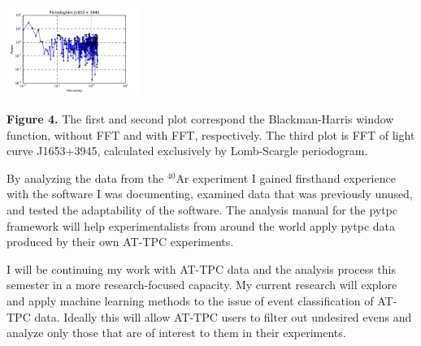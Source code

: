 \documentclass[a0paper,portrait]{baposter}
\begin{document}
\begin{poster}
{\begin{center}
\includegraphics [height=30mm, width=43mm] {FFTcurva_2.pdf}
\end{center}
\small{\textbf{Figure 4.} The first and second plot correspond the  Blackman-Harris window function, without FFT and with FFT, respectively. The third plot is FFT of light curve J1653+3945, calculated exclusively by Lomb-Scargle periodogram.}
}

{\small{ By analyzing the data from the $^{40}$Ar experiment I gained firsthand experience with the software I was documenting, examined data that was previously unused, and tested the adaptability of the software. The analysis manual for the pytpc framework will help experimentalists from around the world apply pytpc data produced by their own AT-TPC experiments.


I will be continuing my work with AT-TPC data and the analysis process this semester in a more research-focused capacity. My current research will explore and apply machine learning methods to the issue of event classification of AT-TPC data. Ideally this will allow AT-TPC users to filter out undesired evens and analyze only those that are of interest to them in their experiments. }
}

\end{poster}
\end{document}
